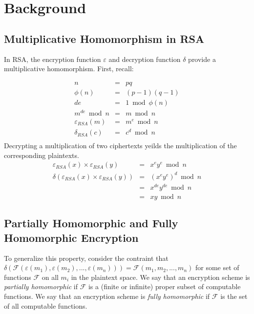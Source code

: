 \documentclass[a4paper,10pt]{article}
\begin{document}
\section{Background}

\subsection{Multiplicative Homomorphism in RSA}
In RSA, the encryption function $\varepsilon$ and decryption function
$\delta$ provide a multiplicative homomorphism. First, recall:

\begin{eqnarray*}
n &=& pq\\
\phi(n) &=& (p-1)(q-1)\\
de &=& 1 \bmod \phi(n)\\
m^{de} \bmod n &=& m \bmod n\\
\varepsilon_{RSA}(m) &=& m^e \bmod n\\
\delta_{RSA}(c) &=& c^d \bmod n\\
\end{eqnarray*}
Decrypting a multiplication of two ciphertexts yeilds the multiplication of the corresponding plaintexts.
\begin{eqnarray*}
\varepsilon_{RSA}(x) \times \varepsilon_{RSA}(y) &=& x^e y^e \bmod n\\
\delta(\varepsilon_{RSA}(x) \times \varepsilon_{RSA}(y)) &=& (x^e y^e)^d \bmod n\\
&=& x^{de} y^{de} \bmod n\\
&=& x y \bmod n
\end{eqnarray*}

\subsection{Partially Homomorphic and Fully Homomorphic Encryption}
To generalize this property, consider the contraint that
$\delta(\mathcal{F}(\varepsilon(m_1), \varepsilon(m_2), ...,
\varepsilon(m_n))) = \mathcal{F}(m_1, m_2, ..., m_n)$ for some set of
functions $\mathcal{F}$ on all $m_i$ in the plaintext space. We say
that an encryption scheme is \textit{partially homomorphic} if
$\mathcal{F}$ is a (finite or infinite) proper subset of computable
functions. We say that an encryption scheme is \textit{fully
  homomorphic} if $\mathcal{F}$ is the set of all computable
functions.
\end{document}

